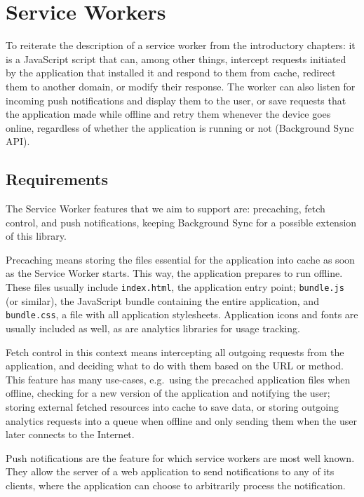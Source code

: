 \documentclass[english,odsaz]{fitthesis}
\begin{document}
\section{Service Workers}
\label{sec:orgb418892}
To reiterate the description of a service worker from the introductory chapters:
it is a JavaScript script that can, among other things, intercept requests
initiated by the application that installed it and respond to them from cache,
redirect them to another domain, or modify their response. The worker can also
listen for incoming push notifications and display them to the user, or save
requests that the application made while offline and retry them whenever the
device goes online, regardless of whether the application is running or not
(Background Sync API).

\subsection{Requirements}
\label{sec:orgd809ad8}
The Service Worker features that we aim to support are: precaching, fetch
control, and push notifications, keeping Background Sync for a possible
extension of this library.

Precaching means storing the files essential for the application into cache as
soon as the Service Worker starts. This way, the application prepares to run
offline. These files usually include \texttt{index.html}, the application entry point;
\texttt{bundle.js} (or similar), the JavaScript bundle containing the entire application,
and \texttt{bundle.css}, a file with all application stylesheets. Application icons and
fonts are usually included as well, as are analytics libraries for usage
tracking.

Fetch control in this context means intercepting all outgoing requests from the
application, and deciding what to do with them based on the URL or method. This
feature has many use-cases, e.g.~using the precached application files when
offline, checking for a new version of the application and notifying the user;
storing external fetched resources into cache to save data, or storing outgoing
analytics requests into a queue when offline and only sending them when the user
later connects to the Internet.

Push notifications are the feature for which service workers are most well
known. They allow the server of a web application to send notifications to any
of its clients, where the application can choose to arbitrarily process the
notification.
\end{document}

